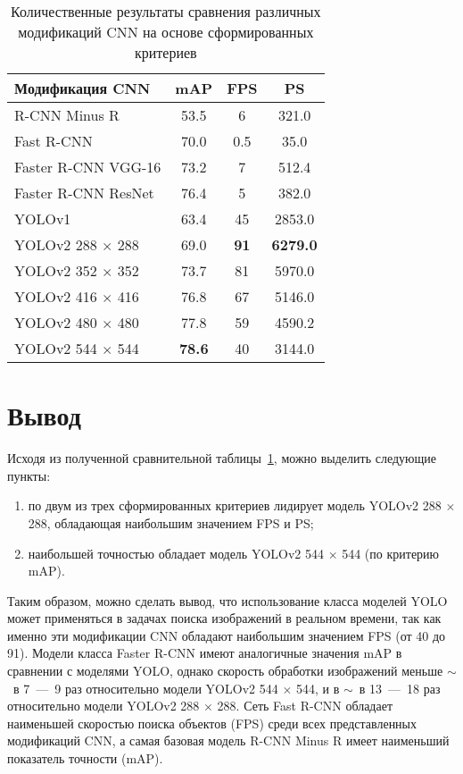 \clearpage
\begin{table}[!ht]
	\centering
	\caption{\label{table1} Количественные результаты сравнения различных модификаций CNN на основе сформированных критериев}
	\begin{tabularx}{\textwidth}{|X|c|c|c|}
		\hline
		Модификация CNN & mAP & FPS & PS \\ \hline
		R-CNN Minus R & 53.5 & 6 & 321.0 \\ \hline
		Fast R-CNN & 70.0 & 0.5 & 35.0 \\ \hline
		Faster R-CNN VGG-16 & 73.2 & 7 & 512.4 \\ \hline
		Faster R-CNN ResNet & 76.4 & 5 & 382.0 \\ \hline
		YOLOv1 & 63.4 & 45 & 2853.0 \\ \hline
		YOLOv2 288 $\times$ 288 & 69.0 & \textbf{91} & \textbf{6279.0} \\ \hline
		YOLOv2 352 $\times$ 352 & 73.7 & 81 & 5970.0 \\ \hline
		YOLOv2 416 $\times$ 416 & 76.8 & 67 & 5146.0 \\ \hline
		YOLOv2 480 $\times$ 480 & 77.8 & 59 & 4590.2 \\ \hline
		YOLOv2 544 $\times$ 544 & \textbf{78.6} & 40 & 3144.0 \\ \hline
	\end{tabularx}
\end{table}

\section*{Вывод}

Исходя из полученной сравнительной таблицы~\ref{table1}, можно выделить следующие пункты:
\begin{enumerate}
	\item по двум из трех сформированных критериев лидирует модель YOLOv2 288 $\times$ 288, обладающая наибольшим значением FPS и PS;
	\item наибольшей точностью обладает модель YOLOv2 544 $\times$ 544 (по критерию mAP).
\end{enumerate}

Таким образом, можно сделать вывод, что использование класса моделей YOLO может применяться в задачах поиска изображений в реальном времени, так как именно эти модификации CNN обладают наибольшим значением FPS (от 40 до 91).
Модели класса Faster R-CNN имеют аналогичные значения mAP в сравнении с моделями YOLO, однако скорость обработки изображений меньше $\sim$~в  7~---~9 раз относительно модели YOLOv2 544 $\times$ 544, и в $\sim$~в  13~---~18 раз относительно модели YOLOv2 288 $\times$ 288.
Сеть Fast R-CNN обладает наименьшей скоростью поиска объектов (FPS) среди всех представленных модификаций CNN, а самая базовая модель R-CNN Minus R имеет наименьший показатель точности (mAP).